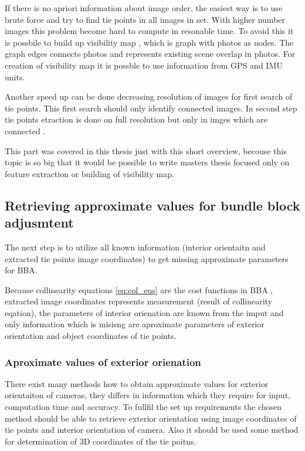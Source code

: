 \documentclass[a4paper,12pt]{report}
\begin{document}
\begin{itemize}
If there is no apriori information about image order, the easiest way is to use brute force and 
try to find tie points in all images in set. With higher number images this problem become 
hard to compute in resonable time. To avoid this it is possbile to build up visibility map \cite{barazzetti2010extraction}, 
which is graph with photos as nodes. The graph edges connects photos and represents existing scene overlap 
in photos. For creation of visibility map it is possble to use information from GPS and IMU units.

Another speed up can be done decreasing resolution of images 
for first search of tie points. This first search should only identify connected images.
In second step tie points etraction is done on full resolution but only in imges which 
are connected .

This part was covered in this thesis just with this short overview, becouse this topic is so big 
that it would be possible to write masters thesis focused only on feature extraction or building 
of visibility map.


\subsection{Retrieving approximate values for bundle block adjusmtent}


The next step is to utilize all known information (interior orientaitn and extracted 
tie points image coordinates)  to get missing approximate parameters for BBA. 

Because collinearity equations \ref{eq:col_eqs} are the cost functions in BBA ,
extracted image coordinates represents measurement (result of collinearity eqation),
the parameters of interior orienation are known from the imput and only information 
which is misisng are aproximate parameters of exterior orientation and object coordinates of 
tie points. 

\subsubsection{Aproximate values of exterior orienation}

There exist many methods how to obtain approximate values for exterior orientaiton of cameras, they 
differs in information which they require for input, computation time and accuracy. 
To fullfil the set up requirements the chosen method should be able to retrieve exterior orientation 
using image coordinates of tie points and interior orientation of camera.
Also it should be used some method for determination of 3D coordinates of the tie poitns.


\end{itemize}
\end{document}
